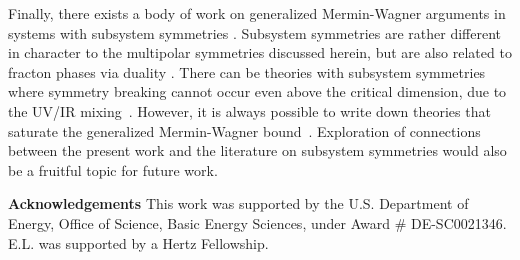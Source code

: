 \documentclass[prb,aps,twocolumn, amsfonts,amsmath,amssymb,nofootinbib,superscriptaddress]{revtex4-2}
\begin{document}
Finally, there exists a body of work on generalized Mermin-Wagner arguments in systems with subsystem symmetries \cite{Batista2005, SeibergA, SeibergB, SeibergC, Gorantla2021, Distler2021}. Subsystem symmetries are rather different in character to the multipolar symmetries discussed herein, but are also related to fracton phases via duality \cite{VHF2}. There can be theories with subsystem symmetries where symmetry breaking cannot occur even above the critical dimension, due to the UV/IR mixing~\cite{Gorantla2021}. However, it is always possible to write down theories that saturate the generalized Mermin-Wagner bound~\cite{Distler2021}.
Exploration of connections between the present work and the literature on subsystem symmetries would also be a fruitful topic for future work. 

{\bf Acknowledgements} This work was supported by
the U.S. Department of Energy, Office of Science, Basic
Energy Sciences, under Award \# DE-SC0021346. E.L. was supported by a Hertz Fellowship. 


\end{document}
